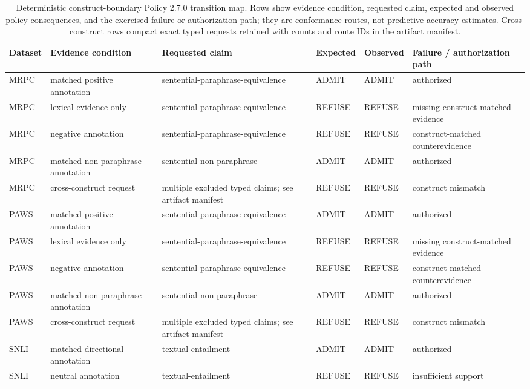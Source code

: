 \begin{table}[t]
  \caption{Deterministic construct-boundary Policy 2.7.0 transition map. Rows show evidence condition, requested claim, expected and observed policy consequences, and the exercised failure or authorization path; they are conformance routes, not predictive accuracy estimates. Cross-construct rows compact exact typed requests retained with counts and route IDs in the artifact manifest.}
  \label{tab:external-validation}
  \centering
  \scriptsize
  \begin{tabular}{@{}p{}p{}p{}p{}p{}p{}@{}}
    \toprule
    Dataset & Evidence condition & Requested claim & Expected & Observed & Failure / authorization path \\
    \midrule
    MRPC & matched positive annotation & sentential-paraphrase-equivalence & ADMIT & ADMIT & authorized \\
    MRPC & lexical evidence only & sentential-paraphrase-equivalence & REFUSE & REFUSE & missing construct-matched evidence \\
    MRPC & negative annotation & sentential-paraphrase-equivalence & REFUSE & REFUSE & construct-matched counterevidence \\
    MRPC & matched non-paraphrase annotation & sentential-non-paraphrase & ADMIT & ADMIT & authorized \\
    MRPC & cross-construct request & multiple excluded typed claims; see artifact manifest & REFUSE & REFUSE & construct mismatch \\
    PAWS & matched positive annotation & sentential-paraphrase-equivalence & ADMIT & ADMIT & authorized \\
    PAWS & lexical evidence only & sentential-paraphrase-equivalence & REFUSE & REFUSE & missing construct-matched evidence \\
    PAWS & negative annotation & sentential-paraphrase-equivalence & REFUSE & REFUSE & construct-matched counterevidence \\
    PAWS & matched non-paraphrase annotation & sentential-non-paraphrase & ADMIT & ADMIT & authorized \\
    PAWS & cross-construct request & multiple excluded typed claims; see artifact manifest & REFUSE & REFUSE & construct mismatch \\
    SNLI & matched directional annotation & textual-entailment & ADMIT & ADMIT & authorized \\
    SNLI & neutral annotation & textual-entailment & REFUSE & REFUSE & insufficient support \\

\end{tabular}
\end{table}
